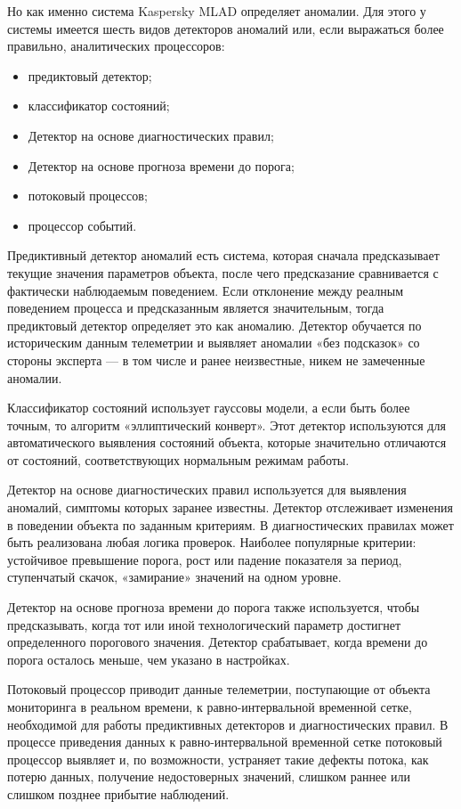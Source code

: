 Но как именно система Kaspersky MLAD определяет аномалии. Для этого у системы имеется шесть видов детекторов аномалий или, если выражаться более правильно, аналитических процессоров:

\begin{itemize}
    \item предиктовый детектор;
    \item классификатор состояний;
    \item Детектор на основе диагностических правил;
    \item Детектор на основе прогноза времени до порога;
    \item потоковый процессов;
    \item процессор событий.
\end{itemize}

Предиктивный детектор аномалий есть система, которая сначала предсказывает текущие значения параметров объекта, после чего предсказание сравнивается с фактически наблюдаемым поведением. Если отклонение между реалным поведением процесса и предсказанным является значительным, тогда предиктовый детектор определяет это как аномалию. Детектор обучается по историческим данным телеметрии и выявляет аномалии «без подсказок» со стороны эксперта — в том числе и ранее неизвестные, никем не замеченные аномалии.

Классификатор состояний использует гауссовы модели, а если быть более точным, то алгоритм «эллиптический конверт». Этот детектор используются для автоматического выявления состояний объекта, которые значительно отличаются от состояний, соответствующих нормальным режимам работы.

Детектор на основе диагностических правил используется для выявления аномалий, симптомы которых заранее известны. Детектор отслеживает изменения в поведении объекта по заданным критериям. В диагностических правилах может быть реализована любая логика проверок. Наиболее популярные критерии: устойчивое превышение порога, рост или падение показателя за период, ступенчатый скачок, «замирание» значений на одном уровне.

Детектор на основе прогноза времени до порога также используется, чтобы предсказывать, когда тот или иной технологический параметр достигнет определенного порогового значения. Детектор срабатывает, когда времени до порога осталось меньше, чем указано в настройках.

Потоковый процессор приводит данные телеметрии, поступающие от объекта мониторинга в реальном времени, к равно-интервальной временной сетке, необходимой для работы предиктивных детекторов и диагностических правил. В процессе приведения данных к равно-интервальной временной сетке потоковый процессор выявляет и, по возможности, устраняет такие дефекты потока, как потерю данных, получение недостоверных значений, слишком раннее или слишком позднее прибытие наблюдений.

